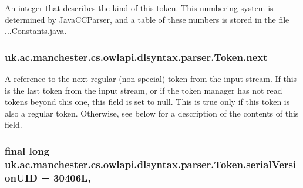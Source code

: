 An integer that describes the kind of this token. This numbering system is determined by Java\-C\-C\-Parser, and a table of these numbers is stored in the file ...Constants.\-java. \hypertarget{classuk_1_1ac_1_1manchester_1_1cs_1_1owlapi_1_1dlsyntax_1_1parser_1_1_token_aed26a787d20a02c07a9e6dec491e0094}{
\subsubsection[{next}]{ uk.\-ac.\-manchester.\-cs.\-owlapi.\-dlsyntax.\-parser.\-Token.\-next}}\label{classuk_1_1ac_1_1manchester_1_1cs_1_1owlapi_1_1dlsyntax_1_1parser_1_1_token_aed26a787d20a02c07a9e6dec491e0094}
A reference to the next regular (non-\/special) token from the input stream. If this is the last token from the input stream, or if the token manager has not read tokens beyond this one, this field is set to null. This is true only if this token is also a regular token. Otherwise, see below for a description of the contents of this field. \hypertarget{classuk_1_1ac_1_1manchester_1_1cs_1_1owlapi_1_1dlsyntax_1_1parser_1_1_token_a5dea46cd395e4d7b437d067f84f34e69}{
\subsubsection[{serial\-Version\-U\-I\-D}]{\setlength{\rightskip}{0pt plus 5cm}final long uk.\-ac.\-manchester.\-cs.\-owlapi.\-dlsyntax.\-parser.\-Token.\-serial\-Version\-U\-I\-D = 30406\-L\hspace{0.3cm}{\ttfamily [static]}, {\ttfamily [private]}}}\label{classuk_1_1ac_1_1manchester_1_1cs_1_1owlapi_1_1dlsyntax_1_1parser_1_1_token_a5dea46cd395e4d7b437d067f84f34e69}
